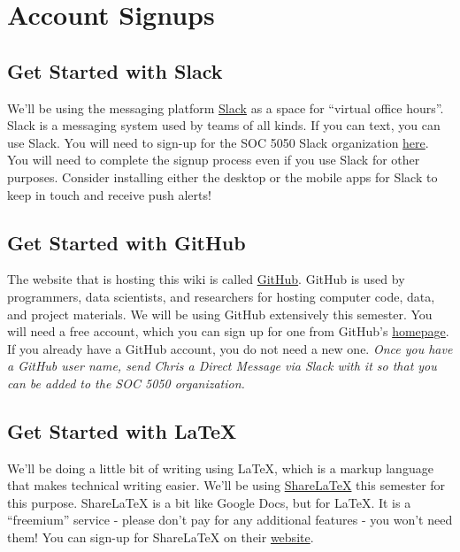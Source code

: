 \documentclass[]{book}
\theoremstyle{definition}
\theoremstyle{definition}
\theoremstyle{definition}
\theoremstyle{remark}
\begin{document}
\section{Account Signups}\label{account-signups}

\subsection{Get Started with Slack}\label{get-started-with-slack}

We'll be using the messaging platform \href{https://slack.com}{Slack} as
a space for ``virtual office hours''. Slack is a messaging system used
by teams of all kinds. If you can text, you can use Slack. You will need
to sign-up for the SOC 5050 Slack organization
\href{https://join.slack.com/t/slu-soc5050/signup}{here}. You will need
to complete the signup process even if you use Slack for other purposes.
Consider installing either the desktop or the mobile apps for Slack to
keep in touch and receive push alerts!

\subsection{Get Started with GitHub}\label{get-started-with-github}

The website that is hosting this wiki is called
\href{https://github.com/}{GitHub}. GitHub is used by programmers, data
scientists, and researchers for hosting computer code, data, and project
materials. We will be using GitHub extensively this semester. You will
need a free account, which you can sign up for one from GitHub's
\href{https://github.com/}{homepage}. If you already have a GitHub
account, you do not need a new one. \emph{Once you have a GitHub user
name, send Chris a Direct Message via Slack with it so that you can be
added to the SOC 5050 organization.}

\subsection{Get Started with LaTeX}\label{get-started-with-latex}

We'll be doing a little bit of writing using LaTeX, which is a markup
language that makes technical writing easier. We'll be using
\href{https://www.sharelatex.com}{ShareLaTeX} this semester for this
purpose. ShareLaTeX is a bit like Google Docs, but for LaTeX. It is a
``freemium'' service - please don't pay for any additional features -
you won't need them! You can sign-up for ShareLaTeX on their
\href{https://www.sharelatex.com}{website}.
\end{document}
